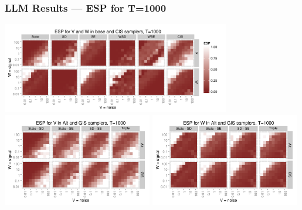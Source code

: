 \documentclass[xcolor=dvipsnames]{beamer}
\begin{document}
\begin{frame}
\frametitle{LLM Results --- ESP for T=1000}
\centering
\includegraphics[width=0.75\textwidth]{basecisESplot1000}\\
\includegraphics[width=0.49\textwidth]{altintESplotV1000}
\includegraphics[width=0.49\textwidth]{altintESplotW1000}
\end{frame}
\end{document}
